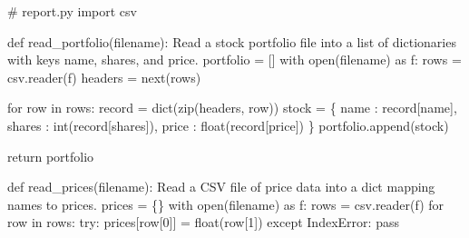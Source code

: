 \documentclass[
  letterpaper,
  DIV=11,
  numbers=noendperiod]{scrreprt}
\newenvironment{Shaded}{\begin{snugshade}}{\end{snugshade}}
\newcommand{\BuiltInTok}[1]{\textcolor[rgb]{0.00,0.46,0.62}{#1}}
\newcommand{\CommentTok}[1]{\textcolor[rgb]{0.37,0.37,0.37}{#1}}
\newcommand{\ControlFlowTok}[1]{\textcolor[rgb]{0.00,0.46,0.62}{#1}}
\newcommand{\DecValTok}[1]{\textcolor[rgb]{0.68,0.00,0.00}{#1}}
\newcommand{\ImportTok}[1]{\textcolor[rgb]{0.00,0.46,0.62}{#1}}
\newcommand{\KeywordTok}[1]{\textcolor[rgb]{0.00,0.46,0.62}{#1}}
\newcommand{\NormalTok}[1]{\textcolor[rgb]{0.00,0.46,0.62}{#1}}
\newcommand{\OperatorTok}[1]{\textcolor[rgb]{0.37,0.37,0.37}{#1}}
\newcommand{\PreprocessorTok}[1]{\textcolor[rgb]{0.68,0.00,0.00}{#1}}
\newcommand{\StringTok}[1]{\textcolor[rgb]{0.13,0.47,0.30}{#1}}
\begin{document}
\begin{Shaded}
\begin{Highlighting}[]
\CommentTok{\# report.py}
\ImportTok{import}\NormalTok{ csv}

\KeywordTok{def}\NormalTok{ read\_portfolio(filename):}
    \CommentTok{\textquotesingle{}\textquotesingle{}\textquotesingle{}}
\CommentTok{    Read a stock portfolio file into a list of dictionaries with keys}
\CommentTok{    name, shares, and price.}
\CommentTok{    \textquotesingle{}\textquotesingle{}\textquotesingle{}}
\NormalTok{    portfolio }\OperatorTok{=}\NormalTok{ []}
    \ControlFlowTok{with} \BuiltInTok{open}\NormalTok{(filename) }\ImportTok{as}\NormalTok{ f:}
\NormalTok{        rows }\OperatorTok{=}\NormalTok{ csv.reader(f)}
\NormalTok{        headers }\OperatorTok{=} \BuiltInTok{next}\NormalTok{(rows)}

        \ControlFlowTok{for}\NormalTok{ row }\KeywordTok{in}\NormalTok{ rows:}
\NormalTok{            record }\OperatorTok{=} \BuiltInTok{dict}\NormalTok{(}\BuiltInTok{zip}\NormalTok{(headers, row))}
\NormalTok{            stock }\OperatorTok{=}\NormalTok{ \{}
                \StringTok{\textquotesingle{}name\textquotesingle{}}\NormalTok{ : record[}\StringTok{\textquotesingle{}name\textquotesingle{}}\NormalTok{],}
                \StringTok{\textquotesingle{}shares\textquotesingle{}}\NormalTok{ : }\BuiltInTok{int}\NormalTok{(record[}\StringTok{\textquotesingle{}shares\textquotesingle{}}\NormalTok{]),}
                \StringTok{\textquotesingle{}price\textquotesingle{}}\NormalTok{ : }\BuiltInTok{float}\NormalTok{(record[}\StringTok{\textquotesingle{}price\textquotesingle{}}\NormalTok{])}
\NormalTok{            \}}
\NormalTok{            portfolio.append(stock)}

    \ControlFlowTok{return}\NormalTok{ portfolio}

\KeywordTok{def}\NormalTok{ read\_prices(filename):}
    \CommentTok{\textquotesingle{}\textquotesingle{}\textquotesingle{}}
\CommentTok{    Read a CSV file of price data into a dict mapping names to prices.}
\CommentTok{    \textquotesingle{}\textquotesingle{}\textquotesingle{}}
\NormalTok{    prices }\OperatorTok{=}\NormalTok{ \{\}}
    \ControlFlowTok{with} \BuiltInTok{open}\NormalTok{(filename) }\ImportTok{as}\NormalTok{ f:}
\NormalTok{        rows }\OperatorTok{=}\NormalTok{ csv.reader(f)}
        \ControlFlowTok{for}\NormalTok{ row }\KeywordTok{in}\NormalTok{ rows:}
            \ControlFlowTok{try}\NormalTok{:}
\NormalTok{                prices[row[}\DecValTok{0}\NormalTok{]] }\OperatorTok{=} \BuiltInTok{float}\NormalTok{(row[}\DecValTok{1}\NormalTok{])}
            \ControlFlowTok{except} \PreprocessorTok{IndexError}\NormalTok{:}
                \ControlFlowTok{pass}


\end{Highlighting}
\end{Shaded}
\end{document}
